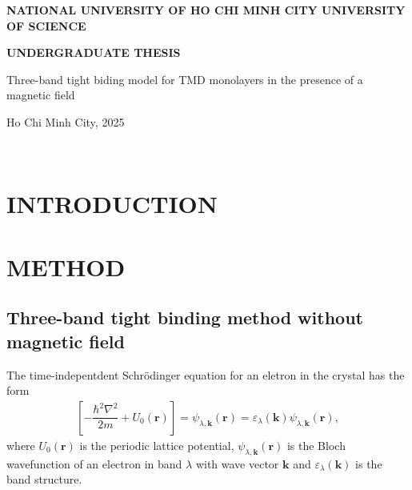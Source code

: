 \documentclass{report}
\newcommand{\f}[2]{\dfrac{#1}{#2}}
\newcommand{\thesistitlee}{Three-band tight biding model for TMD monolayers in the presence of a magnetic field}
\newcommand{\address}{NATIONAL UNIVERSITY OF HO CHI MINH CITY UNIVERSITY OF SCIENCE}
\newcommand{\graddate}{Ho Chi Minh City, 2025}
\begin{document}
\setlength{\parindent}{20pt}
\begin{center}
	{\bfseries

		{\large {\bf \address}}\\
		\vspace{2.5cm}

		{\large {\bf UNDERGRADUATE THESIS}}\\
		\vspace{3.0cm}


		{\largerrr\thesistitlee}
		\vspace{1in}

		{\large\graddate}
	}

\end{center}
\noindent
\makebox[\textwidth]{\hfill\makebox[3in]{\hrulefill}}\\
\begin{center}
\end{center}
\newpage
\pagestyle{fancy}
\renewcommand{\headrulewidth}{0pt}
\fancyhf{}
\fancyfoot[C]{\hspace{0cm} \thepage}
\setcounter{page}{1}
\renewcommand{\contentsname}{TABLE OF CONTENTS}
\tableofcontents
\renewcommand{\listfigurename}{LIST OF FIGURES}
\listoffigures
\chapter{\textbf{INTRODUCTION}}
\chapter{\textbf{METHOD}}
\section{Three-band tight binding method without magnetic field}
The time-indepentdent Schr\"{o}dinger equation for an eletron in the crystal has the form
\begin{gather}
	\left[-\f{\hbar^{2} \nabla^{2}}{2m} + U_{0}(\mathbf{r})\right] = \psi_{\lambda,\mathbf{k}}(\mathbf{r}) = \varepsilon_{\lambda}(\mathbf{k}) \psi_{\lambda,\mathbf{k}}(\mathbf{r}),
\end{gather}
where $U_{0}(\mathbf{r})$ is the periodic lattice potential, $\psi_{\lambda,\mathbf{k}}(\mathbf{r})$ is the Bloch wavefunction of an electron in band $\lambda$ with wave vector $\mathbf{k}$ and $\varepsilon_{\lambda}(\mathbf{k})$ is the band structure.
\end{document}
